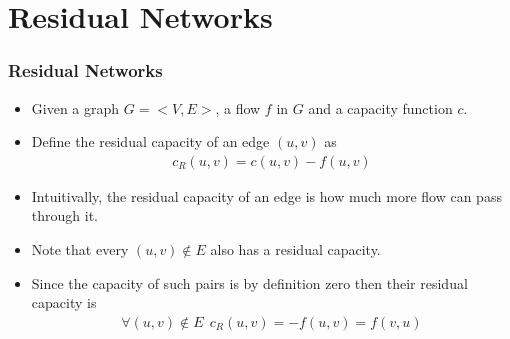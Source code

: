 \documentclass{beamer}
\begin{document}
\section{Residual Networks}
\begin{frame}
  \frametitle{Residual Networks}

  \begin{itemize}
    \item Given a graph $G=<V,E>$, a flow $f$ in $G$ and a capacity function $c$.
    \item Define the residual capacity of an edge $(u,v)$ as
    \begin{align*}
      c_R(u,v)=c(u,v)-f(u,v)
    \end{align*} 
    \item Intuitivally, the residual capacity of an edge is how much more flow can pass through it.
    \item Note that every $(u,v)\notin E$ also has a residual capacity.
    \item Since the capacity of such pairs is by definition zero then their residual capacity is 
    \begin{align*}
      \forall (u,v)\notin E\ \ c_R(u,v)=-f(u,v)=f(v,u)
    \end{align*} 
  \end{itemize}

\end{frame}
\end{document}
